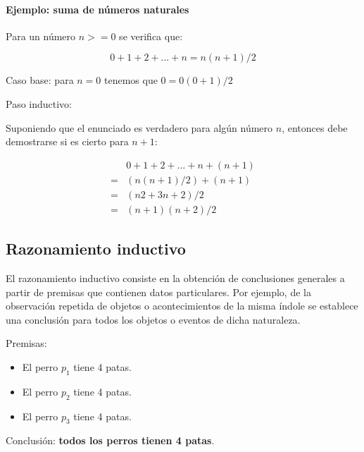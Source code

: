 \documentclass[a4paper, 11pt, titlepage]{article}
\begin{document}
            \paragraph{Ejemplo: suma de números naturales}

            Para un número $n>=0$ se verifica que:

            \[ 0 + 1 + 2 + ... + n = n (n+1)/2 \]

            Caso base: para $n=0$ tenemos que $0=0(0+1)/2$

            Paso inductivo:

            Suponiendo que el enunciado es verdadero para algún número $n$, entonces debe demostrarse si
            es cierto para $n+1$:

            \begin{equation}
                \begin{split}
                    &0 + 1 + 2 + ... + n + (n+1) \\
                    = &(n(n+1)/2) + (n+1) \\
                    = &(n2 + 3n + 2) / 2 \\
                    = &(n+1)(n+2)/2    
                    \nonumber
                \end{split}
            \end{equation}


    \subsection{Razonamiento inductivo}

        El razonamiento inductivo consiste en la obtención de conclusiones generales a partir de 
        premisas que contienen datos particulares. Por ejemplo, de la observación repetida de objetos 
        o acontecimientos de la misma índole se establece una conclusión para todos los objetos o 
        eventos de dicha naturaleza.

        Premisas:

        \begin{itemize}
            \item El perro $p_1$ tiene 4 patas.
            \item El perro $p_2$ tiene 4 patas.
            \item El perro $p_3$ tiene 4 patas.
        \end{itemize}

        Conclusión: \textbf{todos los perros tienen 4 patas}.
\end{document}
